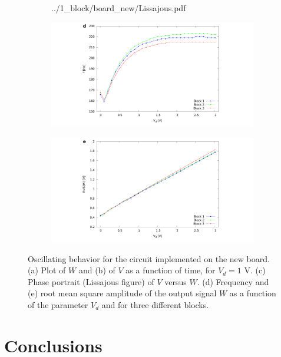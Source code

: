 \begin{figure}[H]
\begin{subfigure}{.39\textwidth}
        {../1_block/board_new/Lissajous.pdf}
    \end{subfigure}
    \begin{subfigure}{.49\textwidth}
        \includegraphics[width=\linewidth,trim={10cm 0 9cm 0},clip,left]
        {../1_block/board_new/freq_board.pdf}
    \end{subfigure}
    \begin{subfigure}{.49\textwidth}
        \centering
        \includegraphics[width=\linewidth,trim={9cm 0 10cm 0},clip,right]
        {../1_block/board_new/rms_board.pdf}
    \end{subfigure}
    \caption{Oscillating behavior for the circuit implemented on
    the new board. (a) Plot of $W$ and (b) of $V$ as a
    function of time, for $V_d=1$ V.
    (c) Phase portrait (Lissajous figure) of $V$ versus $W$. (d)
    Frequency and (e) root mean square amplitude of the
    output signal $W$ as a function of the parameter $V_d$ and for
    three different blocks.}
    \label{fig:oscillation board new}
\end{figure}

\section{Conclusions}\label{sec:conclusions}

